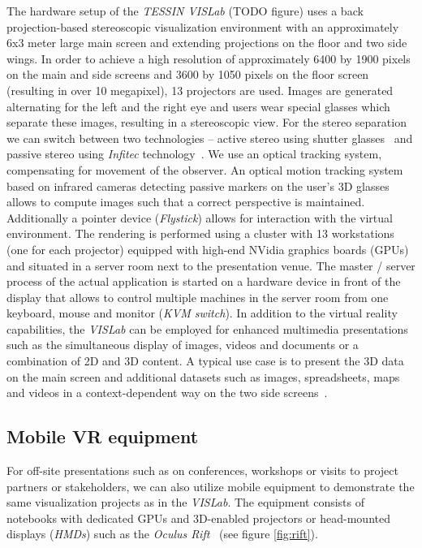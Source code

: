 \documentclass[twocolumn]{svjour3}          %
\begin{document}
The hardware setup of the \emph{TESSIN VISLab} (TODO figure) uses a back projection-based stereoscopic visualization environment with an approximately 6x3 meter large main screen and extending projections on the floor and two side wings. In order to achieve a high resolution of approximately 6400 by 1900 pixels on the main and side screens and 3600 by 1050 pixels on the floor screen (resulting in over 10 megapixel), 13 projectors are used. Images are generated alternating for the left and the right eye and users wear special glasses which separate these images, resulting in a stereoscopic view. For the stereo separation we can switch between two technologies -- active stereo using shutter glasses~\cite{activestereo} and passive stereo using \emph{Infitec} technology~\cite{infitec}. We use an optical tracking system, compensating for movement of the observer. An optical motion tracking system~\cite{tracking} based on infrared cameras detecting passive markers on the user's 3D glasses allows to compute images such that a correct perspective is maintained. Additionally a pointer device (\emph{Flystick}) allows for interaction with the virtual environment. The rendering is performed using a cluster with 13 workstations (one for each projector) equipped with high-end NVidia graphics boards (GPUs) and situated in a server room next to the presentation venue. The master / server process of the actual application is started on a hardware device in front of the display that allows to control multiple machines in the server room from one keyboard, mouse and monitor (\emph{KVM switch}). In addition to the virtual reality capabilities, the \emph{VISLab} can be employed for enhanced multimedia presentations such as the simultaneous display of images, videos and documents or a combination of 2D and 3D content. A typical use case is to present the 3D data on the main screen and additional datasets such as images, spreadsheets, maps and videos in a context-dependent way on the two side screens~\cite{zehner:modelcare}.

\subsection{Mobile VR equipment}
\label{mobile-vr-equipment}

For off-site presentations such as on conferences, workshops or visits to project partners or stakeholders, we can also utilize mobile equipment to demonstrate the same visualization projects as in the \emph{VISLab}. The equipment consists of notebooks with dedicated GPUs and 3D-enabled projectors or head-mounted displays (\emph{HMDs}) such as the \emph{Oculus Rift}~\cite{web:rift} (see figure \ref{fig:rift}).
\end{document}
